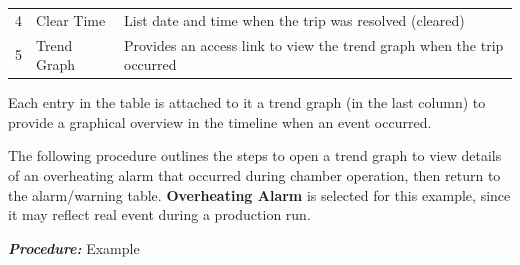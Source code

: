 \begin{longtable}[]{@{}lll@{}}
\begin{minipage}[t]{0.24\columnwidth}
4\strut
\end{minipage} & \begin{minipage}[t]{0.27\columnwidth}\raggedright
Clear Time\strut
\end{minipage} & \begin{minipage}[t]{0.40\columnwidth}\raggedright
List date and time when the trip was resolved (cleared)\strut
\end{minipage}\tabularnewline
\begin{minipage}[t]{0.24\columnwidth}\raggedright
5\strut
\end{minipage} & \begin{minipage}[t]{0.27\columnwidth}\raggedright
Trend Graph\strut
\end{minipage} & \begin{minipage}[t]{0.40\columnwidth}\raggedright
Provides an access link to view the trend graph when the trip
occurred\strut
\end{minipage}\tabularnewline
\bottomrule
\end{longtable}

Each entry in the table is attached to it a trend graph (in the last
column) to provide a graphical overview in the timeline when an event
occurred.

The following procedure outlines the steps to open a trend graph to view
details of an overheating alarm that occurred during chamber operation,
then return to the alarm/warning table. \textbf{Overheating Alarm} is
selected for this example, since it may reflect real event during a
production run.

\pagebreak 

\textbf{\emph{Procedure:}} Example

